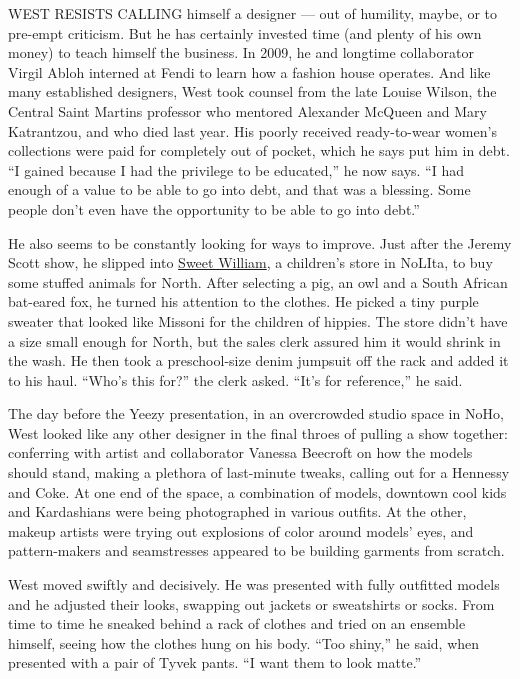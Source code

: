 WEST RESISTS CALLING himself a designer --- out of humility, maybe, or
to pre-empt criticism. But he has certainly invested time (and plenty of
his own money) to teach himself the business. In 2009, he and longtime
collaborator Virgil Abloh interned at Fendi to learn how a fashion house
operates. And like many established designers, West took counsel from
the late Louise Wilson, the Central Saint Martins professor who mentored
Alexander McQueen and Mary Katrantzou, and who died last year. His
poorly received ready-to-wear women's collections were paid for
completely out of pocket, which he says put him in debt. ``I gained
because I had the privilege to be educated,'' he now says. ``I had
enough of a value to be able to go into debt, and that was a blessing.
Some people don't even have the opportunity to be able to go into
debt.''

He also seems to be constantly looking for ways to improve. Just after
the Jeremy Scott show, he slipped into
\href{http://www.sweetwilliamltd.com/}{Sweet William}, a children's
store in NoLIta, to buy some stuffed animals for North. After selecting
a pig, an owl and a South African bat-eared fox, he turned his attention
to the clothes. He picked a tiny purple sweater that looked like Missoni
for the children of hippies. The store didn't have a size small enough
for North, but the sales clerk assured him it would shrink in the wash.
He then took a preschool-size denim jumpsuit off the rack and added it
to his haul. ``Who's this for?'' the clerk asked. ``It's for
reference,'' he said.

The day before the Yeezy presentation, in an overcrowded studio space in
NoHo, West looked like any other designer in the final throes of pulling
a show together: conferring with artist and collaborator Vanessa
Beecroft on how the models should stand, making a plethora of
last-minute tweaks, calling out for a Hennessy and Coke. At one end of
the space, a combination of models, downtown cool kids and Kardashians
were being photographed in various outfits. At the other, makeup artists
were trying out explosions of color around models' eyes, and
pattern-makers and seamstresses appeared to be building garments from
scratch.

West moved swiftly and decisively. He was presented with fully outfitted
models and he adjusted their looks, swapping out jackets or sweatshirts
or socks. From time to time he sneaked behind a rack of clothes and
tried on an ensemble himself, seeing how the clothes hung on his body.
``Too shiny,'' he said, when presented with a pair of Tyvek pants. ``I
want them to look matte.''

